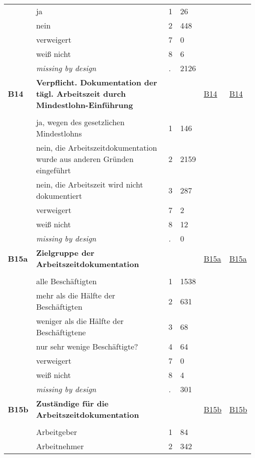 \begin{longtable}{| L{2.45cm} | L{6cm} | C{1.5cm} | R{1cm} | C{2.25cm} | C{2.25cm} |}
   & ja & 1 & 26 &  &  \\ 
   & nein & 2 & 448 &  &  \\ 
   & verweigert & 7 & 0 &  &  \\ 
   & weiß nicht & 8 & 6 &  &  \\ 
   & \textit{missing by design} & \textit{.} & 2126 &  &  \\ 
   \midrule
\textbf{B14}\label{var:B14} & \textbf{Verpflicht. Dokumentation der tägl. Arbeitszeit durch Mindestlohn-Einführung} &  &  & \hyperref[B14]{B14} & \hyperref[var:suf:B14]{B14} \\ 
   &  &  &  &  &  \\ 
   & ja, wegen des gesetzlichen Mindestlohns & 1 & 146 &  &  \\ 
   & nein, die Arbeitszeitdokumentation wurde aus anderen Gründen eingeführt & 2 & 2159 &  &  \\ 
   & nein, die Arbeitszeit wird nicht dokumentiert & 3 & 287 &  &  \\ 
   & verweigert & 7 & 2 &  &  \\ 
   & weiß nicht & 8 & 12 &  &  \\ 
   & \textit{missing by design} & \textit{.} & 0 &  &  \\ 
   \midrule
\textbf{B15a}\label{var:B15a} & \textbf{Zielgruppe der Arbeitszeitdokumentation} &  &  & \hyperref[B15a]{B15a} & \hyperref[var:suf:B15a]{B15a} \\ 
   &  &  &  &  &  \\ 
   & alle Beschäftigten & 1 & 1538 &  &  \\ 
   & mehr als die Hälfte der Beschäftigten & 2 & 631 &  &  \\ 
   & weniger als die Hälfte der Beschäftigtene & 3 & 68 &  &  \\ 
   & nur sehr wenige Beschäftigte? & 4 & 64 &  &  \\ 
   & verweigert & 7 & 0 &  &  \\ 
   & weiß nicht & 8 & 4 &  &  \\ 
   & \textit{missing by design} & \textit{.} & 301 &  &  \\ 
   \midrule
\textbf{B15b}\label{var:B15b} & \textbf{Zuständige für die Arbeitszeitdokumentation} &  &  & \hyperref[B15b]{B15b} & \hyperref[var:suf:B15b]{B15b} \\ 
   &  &  &  &  &  \\ 
   & Arbeitgeber & 1 & 84 &  &  \\ 
   & Arbeitnehmer & 2 & 342 &  &  \\ 

\end{longtable}
